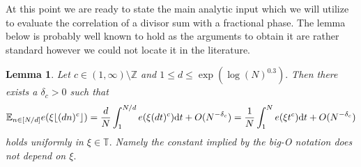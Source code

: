 \documentclass[10pt,leqno]{amsart}
\def\d{{\rm d}}
\def\Z {{\mathbb Z}}
\numberwithin{equation}{section}
\numberwithin{counter2}{section}
\newtheorem{lemma}[subsection]{Lemma}
\theoremstyle{definition}
\theoremstyle{plain}
\newcommand{\TT}{\mathbb{ T} }
\newcommand{\floor}[1]{\lfloor #1 \rfloor}
\newcommand{\EE}{\mathbb{E}}
\begin{document}
	
    At this point we are ready to state the main analytic input which we will utilize to evaluate the  correlation of a divisor sum with a fractional phase. The lemma below is probably well known to hold as the arguments to obtain it are rather standard  however we could not locate it in the literature.
	\begin{lemma}\label{l:analyticlemmacirclemethod} Let $c \in (1,\infty) \setminus \Z $ and $1 \leq d \leq \exp \left(\log(N)^{0.3}\right).$ Then there exists a $\delta_c>0$ such that  \[ \EE_{n \in [N/d]}e(\xi \floor{(dn)^c} )=\frac{d}{N} \int_{1}^{N/d} e(\xi (dt)^c) \d t+O(N^{-\delta_c})=\frac{1}{N} \int_{1}^Ne(\xi t^c) \d t+O(N^{-\delta_c})  \] holds uniformly in $\xi \in \TT.$ Namely the constant implied by the big-O notation does not depend on $\xi.$
		
	\end{lemma}
\end{document}
